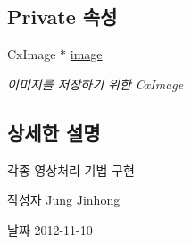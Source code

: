 \subsection*{Private 속성}
\begin{DoxyCompactItemize}
\item 
Cx\-Image $\ast$ \hyperlink{class_my_image_a8ac6996526b9d73661c339db66680676}{image}
\begin{DoxyCompactList}\small\item\em 이미지를 저장하기 위한 Cx\-Image \end{DoxyCompactList}\end{DoxyCompactItemize}


\subsection{상세한 설명}
각종 영상처리 기법 구현 

\begin{DoxyAuthor}{작성자}
Jung Jinhong 
\end{DoxyAuthor}
\begin{DoxyDate}{날짜}
2012-\/11-\/10 
\end{DoxyDate}


